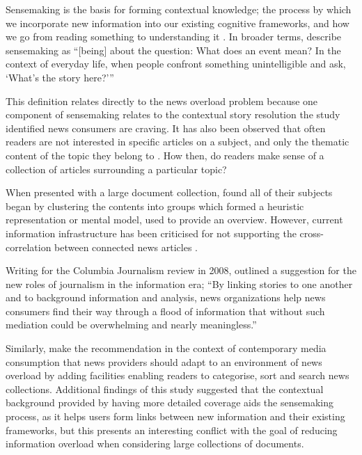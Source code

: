 Sensemaking is the basis for forming contextual knowledge; the process by which we incorporate new information into our existing cognitive frameworks, and how we go from reading something to understanding it \citep{FromInformationToKnowing}. In broader terms, \citeauthor{OrganizingAndTheProcessOfSensemaking} describe sensemaking as ``[being] about the question: What does an event mean? In the context of everyday life, when people confront something unintelligible and ask, `What's the story here?'{}'' \citep[p.85]{OrganizingAndTheProcessOfSensemaking} 

This definition relates directly to the news overload problem because one component of sensemaking relates to the contextual story resolution the \citet{anewmodelfornews} study identified news consumers are craving. It has also been observed that often readers are not interested in specific articles on a subject, and only the thematic content of the topic they belong to \citep{AnalysingUserAccessToAnOnlineNewspaper}. How then, do readers make sense of a collection of articles surrounding a particular topic?

When presented with a large document collection, \citet{BeingLiteratreWithLargeDocumentCollections} found all of their subjects began by clustering the contents into groups which formed a heuristic representation or mental model, used to provide an overview. However, current information infrastructure has been criticised for not supporting the cross-correlation between connected news articles \citep{GalaxyOfNews}.

Writing for the Columbia Journalism review in 2008, \citeauthor{overloadjournalismsbattle} outlined a suggestion for the new roles of journalism in the information era; ``By linking stories to one another and to background information and analysis, news organizations help news consumers find their way through a flood of information that without such mediation could be overwhelming and nearly meaningless.''\citep[p.10]{overloadjournalismsbattle} 

Similarly, \citet{FromInformationToKnowing} make the recommendation in the context of contemporary media consumption that news providers should adapt to an environment of news overload by adding facilities enabling readers to categorise, sort and search news collections. Additional findings of this study suggested that the contextual background provided by having more detailed coverage aids the sensemaking process, as it helps users form links between new information and their existing frameworks, but this presents an interesting conflict with the goal of reducing information overload when considering large collections of documents.


